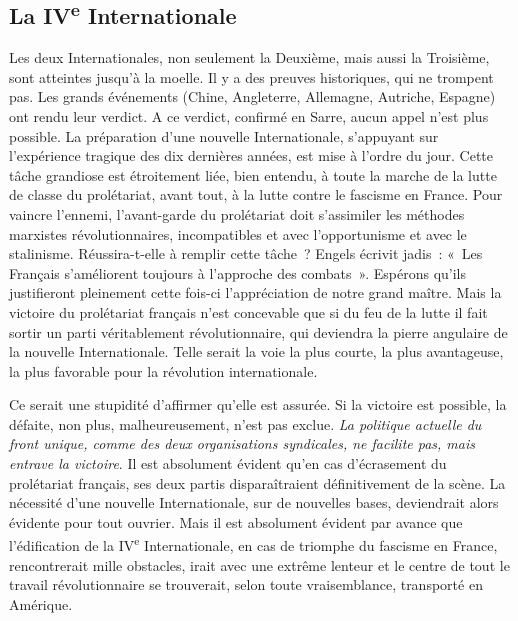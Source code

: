 \documentclass[french,twoside]{book} %
\begin{document}
 \subsection[{La IVe Internationale}]{La IV\textsuperscript{e} Internationale}
\noindent Les deux Internationales, non seulement la Deuxième, mais aussi la Troisième, sont atteintes jusqu’à la moelle. Il y a des preuves historiques, qui ne trompent pas. Les grands événements (Chine, Angleterre, Allemagne, Autriche, Espagne) ont rendu leur verdict. A ce verdict, confirmé en Sarre, aucun appel n’est plus possible. La préparation d’une nouvelle Internationale, s’appuyant sur l’expérience tragique des dix dernières années, est mise à l’ordre du jour. Cette tâche grandiose est étroitement liée, bien entendu, à toute la marche de la lutte de classe du prolétariat, avant tout, à la lutte contre le fascisme en France. Pour vaincre l’ennemi, l’avant-garde du prolétariat doit s’assimiler les méthodes marxistes révolutionnaires, incompatibles et avec l’opportunisme et avec le stalinisme. Réussira-t-elle à remplir cette tâche ? Engels écrivit jadis : « Les Français s’améliorent toujours à l’approche des combats ». Espérons qu’ils justifieront pleinement cette fois-ci l’appréciation de notre grand maître. Mais la victoire du prolétariat français n’est concevable que si du feu de la lutte il fait sortir un parti véritablement révolutionnaire, qui deviendra la pierre angulaire de la nouvelle Internationale. Telle serait la voie la plus courte, la plus avantageuse, la plus favorable pour la révolution internationale.\par
Ce serait une stupidité d’affirmer qu’elle est assurée. Si la victoire est possible, la défaite, non plus, malheureusement, n’est pas exclue. \emph{La politique actuelle du front unique, comme des deux organisations syndicales, ne facilite pas, mais entrave la victoire}. Il est absolument évident qu’en cas d’écrasement du prolétariat français, ses deux partis disparaîtraient définitivement de la scène. La nécessité d’une nouvelle Internationale, sur de nouvelles bases, deviendrait alors évidente pour tout ouvrier. Mais il est  absolument évident par avance que l’édification de la IV\textsuperscript{e} Internationale, en cas de triomphe du fascisme en France, rencontrerait mille obstacles, irait avec une extrême lenteur et le centre de tout le travail révolutionnaire se trouverait, selon toute vraisemblance, transporté en Amérique.\par
\end{document}
